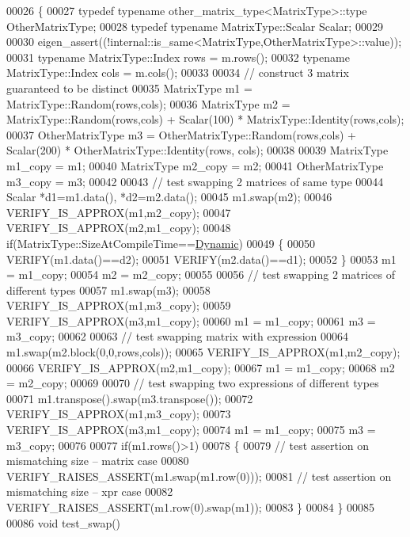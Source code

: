 \begin{DoxyCode}
00026 \{
00027   \textcolor{keyword}{typedef} \textcolor{keyword}{typename} other\_matrix\_type<MatrixType>::type OtherMatrixType;
00028   \textcolor{keyword}{typedef} \textcolor{keyword}{typename} MatrixType::Scalar Scalar;
00029 
00030   eigen\_assert((!internal::is\_same<MatrixType,OtherMatrixType>::value));
00031   \textcolor{keyword}{typename} MatrixType::Index rows = m.rows();
00032   \textcolor{keyword}{typename} MatrixType::Index cols = m.cols();
00033   
00034   \textcolor{comment}{// construct 3 matrix guaranteed to be distinct}
00035   MatrixType m1 = MatrixType::Random(rows,cols);
00036   MatrixType m2 = MatrixType::Random(rows,cols) + Scalar(100) * MatrixType::Identity(rows,cols);
00037   OtherMatrixType m3 = OtherMatrixType::Random(rows,cols) + Scalar(200) * OtherMatrixType::Identity(rows,
      cols);
00038   
00039   MatrixType m1\_copy = m1;
00040   MatrixType m2\_copy = m2;
00041   OtherMatrixType m3\_copy = m3;
00042   
00043   \textcolor{comment}{// test swapping 2 matrices of same type}
00044   Scalar *d1=m1.data(), *d2=m2.data();
00045   m1.swap(m2);
00046   VERIFY\_IS\_APPROX(m1,m2\_copy);
00047   VERIFY\_IS\_APPROX(m2,m1\_copy);
00048   \textcolor{keywordflow}{if}(MatrixType::SizeAtCompileTime==\hyperlink{namespace_eigen_ad81fa7195215a0ce30017dfac309f0b2}{Dynamic})
00049   \{
00050     VERIFY(m1.data()==d2);
00051     VERIFY(m2.data()==d1);
00052   \}
00053   m1 = m1\_copy;
00054   m2 = m2\_copy;
00055   
00056   \textcolor{comment}{// test swapping 2 matrices of different types}
00057   m1.swap(m3);
00058   VERIFY\_IS\_APPROX(m1,m3\_copy);
00059   VERIFY\_IS\_APPROX(m3,m1\_copy);
00060   m1 = m1\_copy;
00061   m3 = m3\_copy;
00062   
00063   \textcolor{comment}{// test swapping matrix with expression}
00064   m1.swap(m2.block(0,0,rows,cols));
00065   VERIFY\_IS\_APPROX(m1,m2\_copy);
00066   VERIFY\_IS\_APPROX(m2,m1\_copy);
00067   m1 = m1\_copy;
00068   m2 = m2\_copy;
00069 
00070   \textcolor{comment}{// test swapping two expressions of different types}
00071   m1.transpose().swap(m3.transpose());
00072   VERIFY\_IS\_APPROX(m1,m3\_copy);
00073   VERIFY\_IS\_APPROX(m3,m1\_copy);
00074   m1 = m1\_copy;
00075   m3 = m3\_copy;
00076   
00077   \textcolor{keywordflow}{if}(m1.rows()>1)
00078   \{
00079     \textcolor{comment}{// test assertion on mismatching size -- matrix case}
00080     VERIFY\_RAISES\_ASSERT(m1.swap(m1.row(0)));
00081     \textcolor{comment}{// test assertion on mismatching size -- xpr case}
00082     VERIFY\_RAISES\_ASSERT(m1.row(0).swap(m1));
00083   \}
00084 \}
00085 
00086 \textcolor{keywordtype}{void} test\_swap()

\end{DoxyCode}
